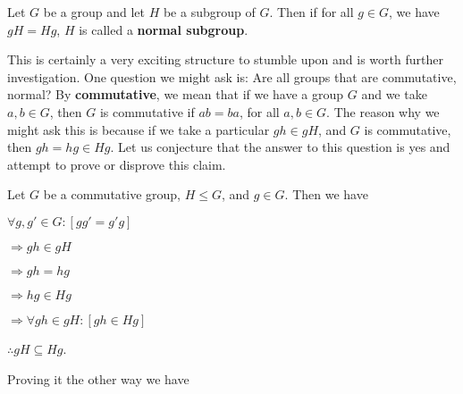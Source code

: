\documentclass[12pt, a4paper]{article}
\begin{document}
    Let $G$ be a group and let $H$ be a subgroup of $G$. Then if for all $g\in G$, we have $gH=Hg$, $H$ is called a \textbf{normal subgroup}.
    
\newpage

    This is certainly a very exciting structure to stumble upon and is worth further investigation. One question we might ask is: Are all groups that are commutative, normal? By \textbf{commutative}, we mean that if we have a group $G$ and we take $a,b\in G$, then $G$ is commutative if $ab=ba$, for all $a,b\in G$. The reason why we might ask this is because if we take a particular $gh\in gH$, and $G$ is commutative, then $gh=hg\in Hg$. Let us conjecture that the answer to this question is yes and attempt to prove or disprove this claim.\par
    
    Let $G$ be a commutative group, $H\leqslant G$, and $g\in G$. Then we have\par
    
\vspace{4mm}

\hspace{2mm} $\forall g,g'\in G\colon[gg'=g'g]$\par
\vspace{2mm}
\hspace{10mm} $\Rightarrow gh\in gH$\par
\vspace{2mm}
\hspace{10mm} $\Rightarrow gh=hg$\par
\vspace{2mm}
\hspace{10mm} $\Rightarrow hg\in Hg$\par
\vspace{2mm}
\hspace{10mm} $\Rightarrow\forall gh\in gH\colon [gh\in Hg]$\par
\vspace{2mm}
\hspace{2mm} $\therefore gH\subseteq Hg$.\par

\begin{flushleft}

    Proving it the other way we have

\end{flushleft}
\end{document}

